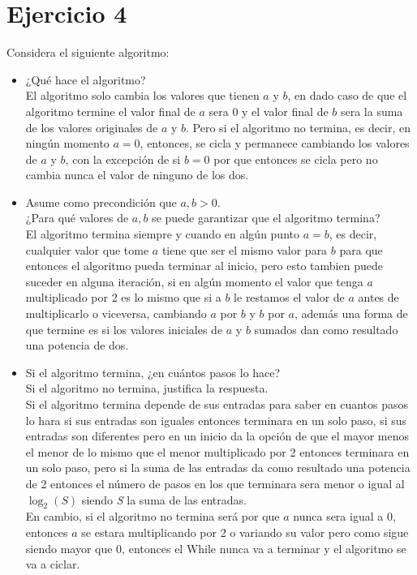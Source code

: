 \documentclass[12pt]{article}
\begin{document}
\section*{Ejercicio 4}
Considera el siguiente algoritmo:
\begin{algorithm}
\end{algorithm}
\begin{itemize}
    \item ¿Qué hace el algoritmo?\\
    El algoritmo solo cambia los valores que tienen $a$ y $b$, en dado caso de que el algoritmo termine el valor final de $a$ sera $0$ y el valor final de $b$ sera la suma de los valores originales de $a$ y $b$. Pero si el algoritmo no termina, es decir, en ningún momento $a = 0$, entonces, se cicla y permanece cambiando los valores de $a$ y $b$, con la excepción de si $b = 0$ por que entonces se cicla pero no cambia nunca el valor de ninguno de los dos.
    \item Asume como precondición que $a, b > 0$.\\
    ¿Para qué valores de $a, b$ se puede garantizar que el algoritmo termina?\\
    El algoritmo termina siempre y cuando en algún punto $a = b$, es decir, cualquier valor que tome $a$ tiene  que ser el mismo valor para $b$ para que entonces el algoritmo pueda terminar al inicio, pero esto tambien puede suceder en alguna iteración, si en algún momento el valor que tenga $a$ multiplicado por 2 es lo mismo que si a $b$ le restamos el valor de $a$ antes de multiplicarlo o viceversa, cambiando $a$ por $b$ y $b$ por $a$, además una forma de que termine es si los valores iniciales de $a$ y $b$ sumados dan como resultado una potencia de dos.
    \item Si el algoritmo termina, ¿en cuántos pasos lo hace?\\
    Si el algoritmo no termina, justifica la respuesta.\\
    Si el algoritmo termina depende de sus entradas para saber en cuantos pasos lo hara si sus entradas son iguales entonces terminara en un solo paso, si sus entradas son diferentes pero en un inicio da la opción de que el mayor menos el menor de lo mismo que el menor multiplicado por 2 entonces terminara en un solo paso, pero si la suma de las entradas da como resultado una potencia de 2 entonces el número de pasos en los que terminara sera menor o igual al $\log_2(S)$ siendo \textit{S} la suma de las entradas.\\
    En cambio, si el algoritmo no termina será por que $a$ nunca sera igual a $0$, entonces $a$ se estara multiplicando por 2 o variando su valor pero como sigue siendo mayor que 0, entonces el While nunca va a terminar y el algoritmo se va a ciclar.
\end{itemize}
\end{document}
